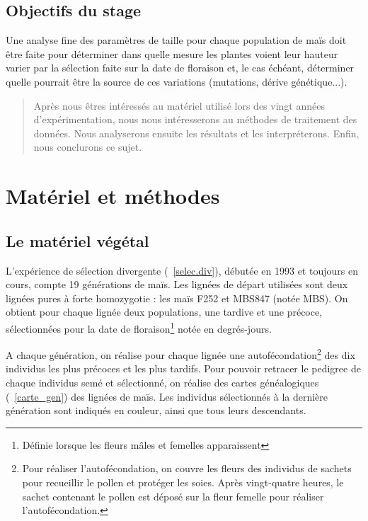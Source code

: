 \documentclass[12pt,a4paper]{article}
\begin{document}
		\subsection{Objectifs du stage}
		
			Une analyse fine des paramètres de taille pour chaque population de maïs doit être faite pour déterminer dans quelle mesure les plantes voient leur hauteur varier par la sélection faite sur la date de floraison et, le cas échéant, déterminer quelle pourrait être la source de ces variations (mutations, dérive génétique...).
			
	\begin{quotation}
		Après nous êtres intéressés au matériel utilisé lors des vingt années d'expérimentation, nous nous intéresserons au méthodes de traitement des données. Nous analyserons ensuite les résultats et les interpréterons. Enfin, nous conclurons ce sujet.
	\end{quotation}
	
	
	\section{Matériel et méthodes}
		
		\subsection{Le matériel végétal}
			
			L'expérience de sélection divergente (~\ref{selec.div}), débutée en 1993 et toujours en cours, compte 19 générations de maïs. Les lignées de départ utilisées sont deux lignées pures à forte homozygotie : les maïs F252 et MBS847 (notée MBS). On obtient pour chaque lignée deux populations, une tardive et une précoce, sélectionnées pour la date de floraison\footnote{Définie lorsque les fleurs mâles et femelles apparaissent} notée en degrés-jours.
			
			A chaque génération, on réalise pour chaque lignée une autofécondation\footnote{Pour réaliser l'autofécondation, on couvre les fleurs des individus de sachets pour recueillir le pollen et protéger les soies. Après vingt-quatre heures, le sachet contenant le pollen est déposé sur la fleur femelle pour réaliser l'autofécondation.} des dix individus les plus précoces et les plus tardifs. Pour pouvoir retracer le pedigree de chaque individus semé et sélectionné, on réalise des cartes généalogiques (~\ref{carte_gen}) des lignées de maïs. Les individus sélectionnés à la dernière génération sont indiqués en couleur, ainsi que tous leurs descendants. %
			
\end{document}

